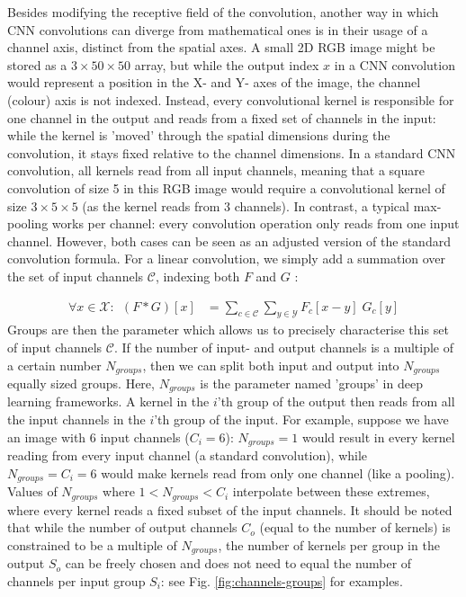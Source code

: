 \documentclass[a4paper, 12pt]{report}
\begin{document}
Besides modifying the receptive field of the convolution, another way in which CNN convolutions can diverge from mathematical ones is in their usage of a channel axis, distinct from the spatial axes. A small 2D RGB image might be stored as a $3\times50\times50$ array, but while the output index $x$ in a CNN convolution would represent a position in the X- and Y- axes of the image, the channel (colour) axis is not indexed. Instead, every convolutional kernel is responsible for one channel in the output and reads from a fixed set of channels in the input: while the kernel is 'moved' through the spatial dimensions during the convolution, it stays fixed relative to the channel dimensions. In a standard CNN convolution, all kernels read from all input channels, meaning that a square convolution of size 5 in this RGB image would require a convolutional kernel of size $3\times5\times5$ (as the kernel reads from 3 channels). In contrast, a typical max-pooling works per channel: every convolution operation only reads from one input channel. However, both cases can be seen as an adjusted version of the standard convolution formula. For a linear convolution, we simply add a summation over the set of input channels $\mathcal{C}$, indexing both $F$ and $G$ \cite{noauthor_conv2d_nodate}:

\begin{align}
\forall x\in\mathcal{X}:~~(F*G)[x] &= \sum_{c\in\mathcal{C}} \sum_{y\in\mathcal{Y}} F_c[x-y]\; G_c[y]
\end{align}
\noindent
Groups are then the parameter which allows us to precisely characterise this set of input channels $\mathcal{C}$. If the number of input- and output channels is a multiple of a certain number $N_{groups}$, then we can split both input and output into $N_{groups}$ equally sized groups. Here, $N_{groups}$ is the parameter named 'groups' in deep learning frameworks. A kernel in the $i$'th group of the output then reads from all the input channels in the $i$'th group of the input. For example, suppose we have an image with 6 input channels ($C_i=6$): $N_{groups}=1$ would result in every kernel reading from every input channel (a standard convolution), while $N_{groups}=C_i=6$ would make kernels read from only one channel (like a pooling). Values of $N_{groups}$ where $1<N_{groups}<C_i$ interpolate between these extremes, where every kernel reads a fixed subset of the input channels. It should be noted that while the number of output channels $C_o$ (equal to the number of kernels) is constrained to be a multiple of $N_{groups}$, the number of kernels per group in the output $S_o$ can be freely chosen and does not need to equal the number of channels per input group $S_i$: see Fig. \ref{fig:channels-groups} for examples.
\end{document}
